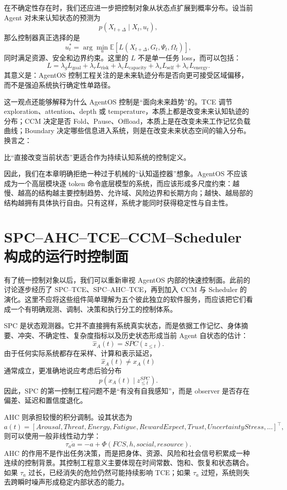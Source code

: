 在不确定性存在时，我们还应进一步把控制对象从状态点扩展到概率分布。设当前 Agent 对未来认知状态的预测为
\[
p(
X_{t+\Delta}
\mid
X_t,u_t
),
\]
那么控制器真正选择的是
\[
u_t^\ast
=
\arg\min_{u}
\mathbb E
\left[
L(
X_{t+\Delta},
G_t,
\Psi_t,
\Omega_t
)
\right],
\]
同时满足资源、安全和边界约束。这里的 $L$ 不是单一任务 loss，而可以包括：
\[
L
=
\lambda_gL_{\mathrm{goal}}
+
\lambda_rL_{\mathrm{risk}}
+
\lambda_cL_{\mathrm{capacity}}
+
\lambda_sL_{\mathrm{self}}
+
\lambda_eL_{\mathrm{energy}}.
\]
其意义是：AgentOS 控制工程关注的是未来轨迹分布是否向更可接受区域偏移，而不是强迫系统执行确定性单路径。

这一观点还能够解释为什么 AgentOS 控制是“面向未来趋势”的。TCE 调节 exploration、attention、depth 或 temperature，本质上都是改变未来认知轨迹的分布；CCM 决定是否 Fold、Pause、Offload，本质上是在改变未来工作记忆负载曲线；Boundary 决定哪些信息进入系统，则是在改变未来状态空间的输入分布。换言之：
\begin{statementbox}
\centering
{}
\end{statementbox}
比“直接改变当前状态”更适合作为持续认知系统的控制定义。

因此，我们在本章明确拒绝一种过于机械的“认知遥控器”想象。AgentOS 不应该成为一个高层模块逐 token 命令底层模型的系统，而应该形成多尺度约束：越慢、越高的结构越主要控制趋势、允许域、风险边界和长期方向；越快、越局部的结构越拥有具体执行自由。只有这样，系统才能同时获得稳定性与自主性。

\section{SPC--AHC--TCE--CCM--Scheduler 构成的运行时控制面}

有了统一控制对象以后，我们可以重新审视 AgentOS 内部的快速控制面。此前的讨论逐步经历了 SPC--TCE、SPC--AHC--TCE，再到加入 CCM 与 Scheduler 的演化。这里不应将这些组件简单理解为五个彼此独立的软件服务，而应该把它们看成一个有明确观测、调制、决策和执行分工的控制体系。

SPC 是状态观测器。它并不直接拥有系统真实状态，而是依据工作记忆、身体摘要、冲突、不确定性、复杂度指标以及历史状态形成当前 Agent 自状态的估计：
\[
\hat x_A(t)
=
SPC(
z_{\le t}
).
\]
由于任何实际系统都存在采样、计算和表示延迟，
\[
\hat x_A(t)
\neq
x_A(t)
\]
通常成立，更准确地说应考虑后验分布
\[
p(
x_A(t)
\mid
z_{\le t}^{SPC}
).
\]
因此，SPC 的第一控制工程问题不是“有没有自我感知”，而是 observer 是否存在偏差、延迟和置信度退化。

AHC 则承担较慢的积分调制。设其状态为
\[
a(t)
=
[
Arousal,
Threat,
Energy,
Fatigue,
RewardExpect,
Trust,
UncertaintyStress,\ldots
]^\top,
\]
则可以使用一般非线性动力学：
\[
\tau_a\dot a
=
-a
+
\Phi(
FCS,
h,
social,
resource
).
\]
AHC 的作用不是作出任务决策，而是把身体、资源、风险和社会信号积累成一种连续的控制背景。其控制工程意义主要体现在时间常数、饱和、恢复和状态耦合。如果 $\tau_a$ 过长，已经消失的危险仍然可能持续影响 TCE；如果 $\tau_a$ 过短，系统则失去跨瞬时噪声形成稳定内部状态的能力。

